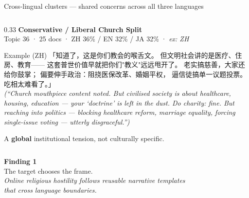 \documentclass[aspectratio=169,10pt]{beamer}
\newcommand{\emphc}[1]{\textcolor{uzhaccent}{\textbf{#1}}}
\begin{document}
\begin{frame}{Cross-lingual clusters — shared concerns across all three languages}
\begin{columns}[T]
    \begin{column}{0.33\textwidth}
      \textbf{Conservative / Liberal Church Split}\\
      \textcolor{mutedgray}{\scriptsize Topic 36 · 25 docs · ZH 36\% / EN 32\% / JA 32\% · \textit{ex: ZH}}
      \vspace{0.4em}

      \begin{block}{Example (ZH)}
      \scriptsize
      「知道了，这是你们教会的喉舌文。
      但文明社会讲的是医疗、住房、教育——
      这套普世价值早就把你们"教义"远远甩开了。
      老实搞慈善，大家还给你鼓掌；
      偏要伸手政治：阻挠医保改革、婚姻平权，
      逼信徒搞单一议题投票。吃相太难看了。」\\[0.3em]
      \textcolor{mutedgray}{\textit{(``Church mouthpiece content noted. But civilised society is about healthcare, housing, education — your `doctrine' is left in the dust. Do charity: fine. But reaching into politics — blocking healthcare reform, marriage equality, forcing single-issue voting — utterly disgraceful.'')}}
      \end{block}
      \vspace{0.2em}
      \scriptsize A \emphc{global} institutional tension, not culturally specific.
    \end{column}

  \end{columns}
  \vspace{0.2em}
\end{frame}

\begin{frame}[plain]
  \centering
  \vspace{1.5cm}
  {\Large \textcolor{uzhblue}{\textbf{Finding 1}}}\\[0.4em]
  {\LARGE The target chooses the frame.}\\[0.8em]
  \small \textit{Online religious hostility follows \emph{reusable}
  narrative templates\\ that cross language boundaries.}
\end{frame}
\end{document}
